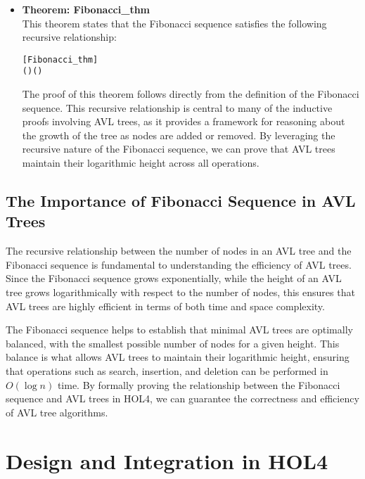 \documentclass[12pt]{article}
\begin{document}
\begin{itemize}
  \item \textbf{Theorem: Fibonacci\_thm} \\
  This theorem states that the Fibonacci sequence satisfies the following recursive relationship:

\begin{alltt}
[Fibonacci_thm]
\HOLTokenTurnstile{}  ( \HOLSymConst{\ensuremath{+}} ) \HOLSymConst{=}  ( \HOLSymConst{\ensuremath{+}} ) \HOLSymConst{\ensuremath{+}}  
\end{alltt}

  The proof of this theorem follows directly from the definition of the Fibonacci sequence. This recursive relationship is central to many of the inductive proofs involving AVL trees, as it provides a framework for reasoning about the growth of the tree as nodes are added or removed. By leveraging the recursive nature of the Fibonacci sequence, we can prove that AVL trees maintain their logarithmic height across all operations.

\end{itemize}

\subsection{The Importance of Fibonacci Sequence in AVL Trees}

The recursive relationship between the number of nodes in an AVL tree and the Fibonacci sequence is fundamental to understanding the efficiency of AVL trees. Since the Fibonacci sequence grows exponentially, while the height of an AVL tree grows logarithmically with respect to the number of nodes, this ensures that AVL trees are highly efficient in terms of both time and space complexity.

The Fibonacci sequence helps to establish that minimal AVL trees are optimally balanced, with the smallest possible number of nodes for a given height. This balance is what allows AVL trees to maintain their logarithmic height, ensuring that operations such as search, insertion, and deletion can be performed in \( O(\log n) \) time. By formally proving the relationship between the Fibonacci sequence and AVL trees in HOL4, we can guarantee the correctness and efficiency of AVL tree algorithms.

\section{Design and Integration in HOL4}
\end{document}
